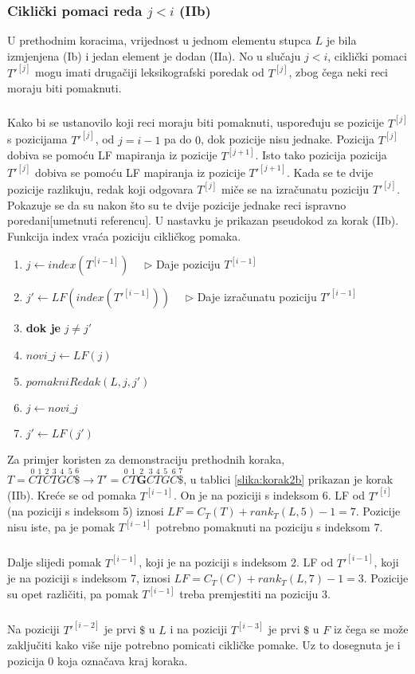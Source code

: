 \documentclass{ferseminar}
\begin{document}
\subsubsection{Ciklički pomaci reda $j<i$ (IIb)}
U prethodnim koracima, vrijednost u jednom elementu stupca $L$ je bila izmjenjena (Ib) i jedan element je dodan (IIa). No u slučaju $j<i$, ciklički pomaci $T'^[j]$ mogu imati drugačiji leksikografski poredak od $T^{[j]}$, zbog čega neki reci moraju biti pomaknuti.
\subparagraph{}
Kako bi se ustanovilo koji reci moraju biti pomaknuti, uspoređuju se pozicije $T^{[j]}$ s pozicijama $T'^{[j]}$, od $j=i-1$ pa do $0$, dok pozicije nisu jednake. Pozicija $T^{[j]}$ dobiva se pomoću LF mapiranja iz pozicije $T^{[j+1]}$. Isto tako pozicija pozicija $T'^{[j]}$ dobiva se pomoću LF mapiranja iz pozicije $T'^{[j+1]}$. Kada se te dvije pozicije razlikuju, redak koji odgovara $T^{[j]}$ miče se na izračunatu poziciju $T'^{[j]}$. Pokazuje se da su nakon što su te dvije pozicije jednake reci ispravno poredani[umetnuti referencu].
U nastavku je prikazan pseudokod za korak (IIb). Funkcija index vraća poziciju cikličkog pomaka.
\footnotesize
\begin{enumerate}
	\item $j\longleftarrow index(T^{[i-1]}) \quad$ $\triangleright$ Daje poziciju $T^{[i-1]}$
	\item $j'\longleftarrow LF(index(T'^{[i-1]})) \quad$ $\triangleright$ Daje izračunatu poziciju $T'^{[i-1]}$
	\item \textbf{dok je} $j\neq j'$
	\item \hspace{.1\textwidth} $novi\_j \longleftarrow LF(j) $
	\item \hspace{.1\textwidth} $pomakniRedak(L,j,j')$
	\item \hspace{.1\textwidth} $j \longleftarrow novi\_j $
	\item \hspace{.1\textwidth} $j' \longleftarrow LF(j') $
\end{enumerate}
\normalsize
Za primjer koristen za demonstraciju prethodnih koraka, $
	T=\overset{0}{C}	\overset{1}{T} \overset{2}{C} \overset{3}{T}	\overset{4}{G}
	\overset{5}{C}	\overset{6}{\$} \rightarrow		
	T'=\overset{0}{C}	\overset{1}{T}	\overset{2}{\boldsymbol{G}}  \overset{3}{C} \overset{4}{T}	\overset{5}{G}
	\overset{6}{C}	\overset{7}{\$} 	
$, u tablici \ref{slika:korak2b} prikazan je korak (IIb). Kreće se od pomaka $T^{[i-1]}$. On je na poziciji s indeksom 6. LF od $T'^{[i]}$ (na poziciji s indeksom 5) iznosi $LF=C_T(T)+rank_T(L,5)-1=7$. Pozicije nisu iste, pa je pomak $T^{[i-1]}$ potrebno pomaknuti na poziciju s indeksom 7.
\subparagraph{}
Dalje slijedi pomak $T^{[i-1]}$, koji je na poziciji s indeksom 2. LF od $T'^{[i-1]}$, koji je na poziciji s indeksom 7, iznosi $LF=C_T(C)+rank_T(L,7)-1=3$. Pozicije su opet različiti, pa pomak $T^{[i-1]}$ treba premjestiti na poziciju 3.
\subparagraph{}
Na poziciji $T'^{[i-2]}$ je prvi $\$$ u $L$ i na poziciji $T^{[i-3]}$ je prvi $\$$ u $F$ iz čega se može zaključiti kako više nije potrebno pomicati cikličke pomake. Uz to dosegnuta je i pozicija 0 koja označava kraj koraka. 
\end{document}
